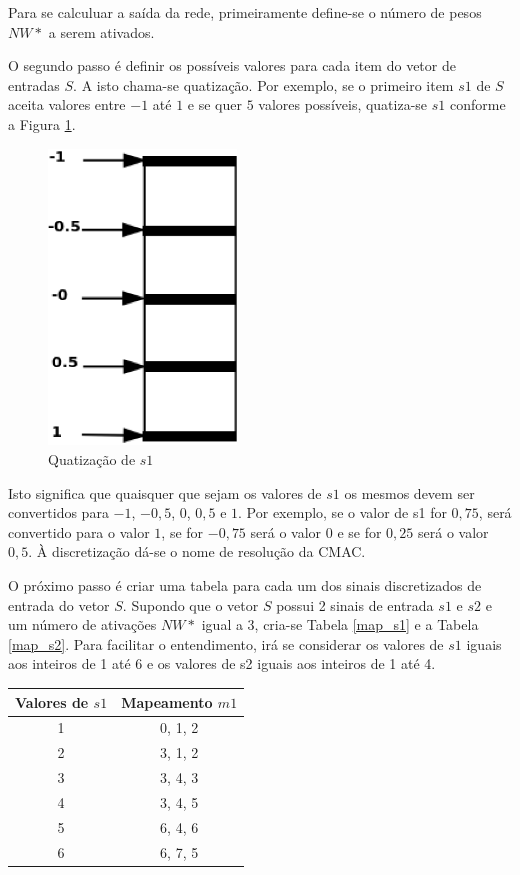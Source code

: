 Para se calculuar a saída da rede, primeiramente define-se o número de pesos $NW*$ a serem ativados.

O segundo passo é definir os possíveis valores para cada item do vetor de entradas $S$. A isto chama-se quatização. Por exemplo, se o primeiro item $s1$ de $S$ aceita valores entre $-1$ até $1$ e se quer $5$ valores possíveis, quatiza-se $s1$ conforme a Figura \ref{quantizacao}.
\begin{figure}[ht]
	\centering
	\includegraphics[width=5cm]{figuras/quatizacao.eps}
	\caption{Quatização de $s1$}
	\label{quantizacao}
\end{figure}

Isto significa que quaisquer que sejam os valores de $s1$ os mesmos devem ser convertidos para $-1$, $-0,5$, $0$, $0,5$ e $1$. 
Por exemplo, se o valor de s1 for $0,75$, será convertido para o valor $1$, se for $-0,75$ será o valor $0$ e se for $0,25$ será o valor $0,5$. À discretização dá-se o nome de resolução da CMAC.

O próximo passo é criar uma tabela para cada um dos sinais discretizados de entrada do vetor $S$.
Supondo que o vetor $S$ possui 2 sinais de entrada $s1$ e $s2$ e um número de ativações $NW*$ igual a 3, cria-se Tabela \ref{map_s1} e a Tabela \ref{map_s2}. 
Para facilitar o entendimento, irá se considerar os valores de $s1$ iguais aos inteiros de 1 até 6 e os valores de s2 iguais aos inteiros de 1 até 4.
\begin{table}[htb]
	{%
		\begin{tabular}{cc}
			\toprule
			\textbf{Valores de $s1$} & \textbf{Mapeamento $m1$} \\
			\midrule
			1	&	0, 1, 2	\\
			\midrule
			2	&	3, 1, 2	\\
			\midrule
			3	&	3, 4, 3	\\
			\midrule
			4	&	3, 4, 5	\\
			\midrule
			5	&	6, 4, 6	\\
			\midrule
			6	&	6, 7, 5	\\
			\bottomrule
		\end{tabular}%
	}
	{%
	}
\end{table}

